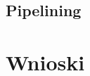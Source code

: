 \documentclass[a4paper,12pt,twoside,openany]{report}
\newcommand{\tech}{\texttt}
\begin{document}
\section{Pipelining}

\chapter{Wnioski}

%
%

\appendix
\chapter{}
\end{document}
